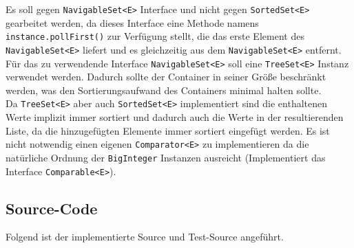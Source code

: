 \documentclass[11pt, a4paper, twoside]{article}   	%
\newcommand{\srcDir}{../src/main/java}
\newcommand{\srcTestDir}{../src/test/java}
\newcommand{\mainPackage}{\srcDir/at/fhooe/swe4/lab3}
\newcommand{\mainTestPackage}{\srcTestDir/at/fhooe/swe4/lab3/test}
\newcommand{\sourceSection}{Source-Code}
\newcommand{\inlinecode}{\lstinline[style=inlineSource]}
\begin{document}
Es soll gegen \inlinecode{NavigableSet<E>} Interface und nicht gegen \inlinecode{SortedSet<E>} gearbeitet werden, da dieses Interface eine Methode namens \inlinecode{instance.pollFirst()} zur Verfügung stellt, die das erste Element des \inlinecode{NavigableSet<E>} liefert und es gleichzeitig aus dem \inlinecode{NavigableSet<E>} entfernt. Für das zu verwendende Interface \inlinecode{NavigableSet<E>} soll eine \inlinecode{TreeSet<E>} Instanz verwendet werden.  Dadurch sollte der Container in seiner Größe beschränkt werden, was den Sortierungsaufwand des Containers minimal halten sollte.\\
Da \inlinecode{TreeSet<E>} aber auch \inlinecode{SortedSet<E>} implementiert sind die enthaltenen Werte implizit immer sortiert und dadurch auch die Werte in der resultierenden Liste, da die hinzugefügten Elemente immer sortiert eingefügt werden. Es ist nicht notwendig einen eigenen \inlinecode{Comparator<E>} zu implementieren da die natürliche Ordnung der \inlinecode{BigInteger} Instanzen ausreicht (Implementiert das Interface \inlinecode{Comparable<E>}). 
\newpage
\subsection{\sourceSection}
Folgend ist der implementierte Source und Test-Source angeführt.


\newpage
\end{document}
